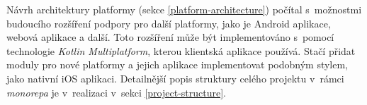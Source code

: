 Návrh architektury platformy (sekce \ref{platform-architecture}) počítal s~možnostmi budoucího rozšíření podpory pro další platformy, jako je Android aplikace, webová aplikace a další. Toto rozšíření může být implementováno s~pomocí technologie \emph{Kotlin Multiplatform}, kterou klientská aplikace používá. Stačí přidat moduly pro nové platformy a jejich aplikace implementovat podobným stylem, jako nativní iOS aplikaci. Detailnější popis struktury celého projektu v~rámci \emph{monorepa} je v~realizaci v~sekci \ref{project-structure}.






































